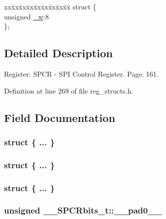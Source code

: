 \begin{DoxyCompactItemize}
\begin{tabbing}
\end{tabbing}\item 
\begin{tabbing}
xx\=xx\=xx\=xx\=xx\=xx\=xx\=xx\=xx\=\kill
struct \{\\
\>unsigned \hyperlink{union_____s_p_c_rbits__t_a06eaabae6fda9f686e280e845a46dadd}{\_w}:8\\
\}; \\

\end{tabbing}\end{DoxyCompactItemize}


\subsection{Detailed Description}
Register\+: S\+P\+C\+R -\/ S\+P\+I Control Register. Page\+: 161. 

Definition at line 269 of file reg\+\_\+structs.\+h.



\subsection{Field Documentation}
\hypertarget{union_____s_p_c_rbits__t_a4d0da545da341d4594b7f417f8bf67a6}{\subsubsection[{"@63}]{\setlength{\rightskip}{0pt plus 5cm}struct \{ ... \} }}\label{union_____s_p_c_rbits__t_a4d0da545da341d4594b7f417f8bf67a6}
\hypertarget{union_____s_p_c_rbits__t_a52a1262f342f007a16c7983a104db635}{\subsubsection[{"@65}]{\setlength{\rightskip}{0pt plus 5cm}struct \{ ... \} }}\label{union_____s_p_c_rbits__t_a52a1262f342f007a16c7983a104db635}
\hypertarget{union_____s_p_c_rbits__t_ab0e884aa539fdfcbe82aeb63631f8885}{\subsubsection[{"@67}]{\setlength{\rightskip}{0pt plus 5cm}struct \{ ... \} }}\label{union_____s_p_c_rbits__t_ab0e884aa539fdfcbe82aeb63631f8885}
\hypertarget{union_____s_p_c_rbits__t_a62daba40d4dad07c9e189858267c4577}{
\subsubsection[{\+\_\+\+\_\+pad0\+\_\+\+\_\+}]{\setlength{\rightskip}{0pt plus 5cm}unsigned \+\_\+\+\_\+\+S\+P\+C\+Rbits\+\_\+t\+::\+\_\+\+\_\+pad0\+\_\+\+\_\+}}\label{union_____s_p_c_rbits__t_a62daba40d4dad07c9e189858267c4577}


